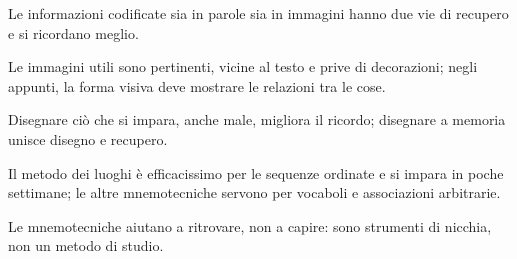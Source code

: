 \begin{sintesi}
  \item Le informazioni codificate sia in parole sia in immagini hanno
        due vie di recupero e si ricordano meglio.
  \item Le immagini utili sono pertinenti, vicine al testo e prive di
        decorazioni; negli appunti, la forma visiva deve mostrare le
        relazioni tra le cose.
  \item Disegnare ciò che si impara, anche male, migliora il ricordo;
        disegnare a memoria unisce disegno e recupero.
  \item Il metodo dei luoghi è efficacissimo per le sequenze ordinate e
        si impara in poche settimane; le altre mnemotecniche servono per
        vocaboli e associazioni arbitrarie.
  \item Le mnemotecniche aiutano a ritrovare, non a capire: sono
        strumenti di nicchia, non un metodo di studio.
\end{sintesi}

\finecapitolo
